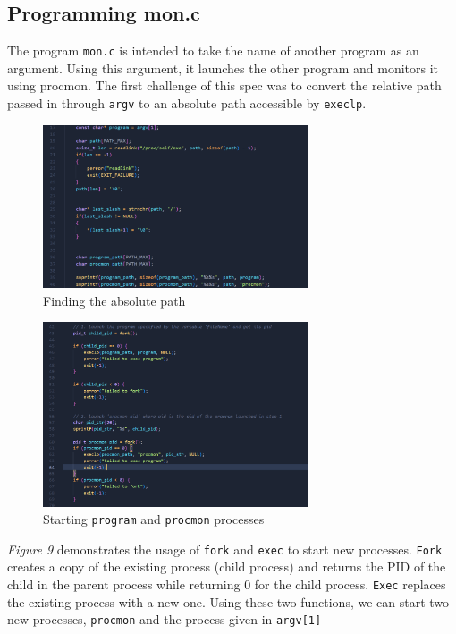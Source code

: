 \subsection{Programming mon.c}\label{subsec:programming-mon.c}
The program \texttt{mon.c} is intended to take the name of another program as an argument.
Using this argument, it launches the other program and monitors it using procmon.
The first challenge of this spec was to convert the relative path
passed in through \texttt{argv} to an absolute path accessible by \texttt{execlp}.
\begin{figure}[H]
        \centering
        \includegraphics[width=0.7\textwidth]{../../screenshots/path-conversion}
        \caption{Finding the absolute path}
        \label{fig:path-conversion}
\end{figure}
\begin{figure}[H]
        \centering
        \includegraphics[width=0.7\textwidth]{../../screenshots/starting-processes}
        \caption{Starting \texttt{program} and \texttt{procmon} processes}
        \label{fig:starting-processes}
\end{figure}
\noindent
\textit{Figure 9} demonstrates the usage of \texttt{fork} and \texttt{exec}
to start new processes.
\texttt{Fork} creates a copy of the existing process (child process) and returns the PID
of the child in the parent process while returning 0 for the child process.
\texttt{Exec} replaces the existing process with a new one.
Using these two functions, we can start two new processes, \texttt{procmon} and
the process given in \texttt{argv[1]}

